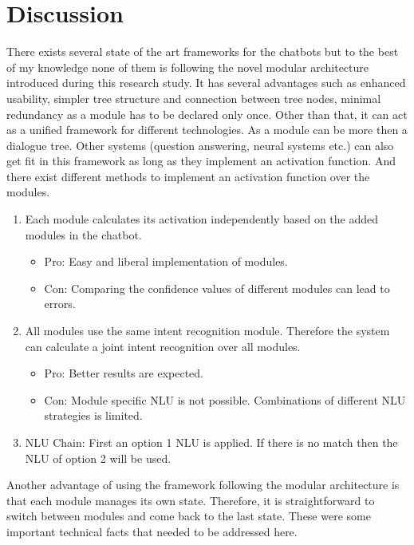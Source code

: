 \section{Discussion\label{sec:discussion}}
There exists several state of the art frameworks for the chatbots but to the best of my knowledge none of them is following the novel modular architecture introduced during this research study. It has several advantages such as enhanced usability, simpler tree structure and connection between tree nodes, minimal redundancy as a module has to be declared only once. Other than that, it can act as a unified framework for different technologies. As a module can be more then a dialogue tree. Other systems (question answering, neural systems etc.) can also get fit in this framework as long as they implement an activation function. And there exist different methods to implement an activation function over the modules. 
\begin{enumerate}
    \item Each module calculates its activation independently based on the added modules in the chatbot.
    \begin{itemize}
        \item Pro: Easy and liberal implementation of modules.
        \item Con: Comparing the confidence values of different modules can lead to errors.
    \end{itemize}
    \item All modules use the same intent recognition module. Therefore the system can calculate a joint intent recognition over all modules.
    \begin{itemize}
        \item Pro: Better results are expected.
        \item Con: Module specific NLU is not possible. Combinations of different NLU strategies is limited.
    \end{itemize}
    \item NLU Chain: First an option 1 NLU is applied. If there is no match then the NLU of option 2 will be used.
\end{enumerate} 
Another advantage of using the framework following the modular architecture is that each module manages its own state. Therefore, it is straightforward to switch between modules and come back to the last state. These were some important technical facts that needed to be addressed here.
\\~\\
